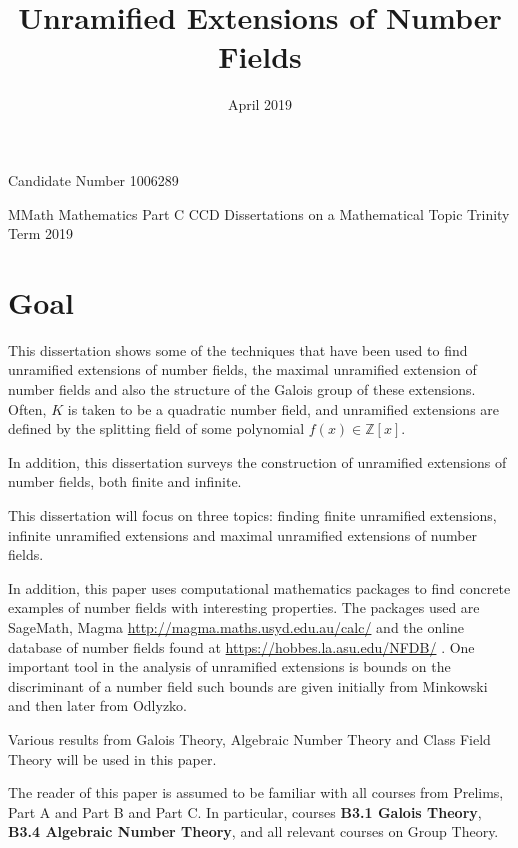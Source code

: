 \documentclass[12pt]{extarticle}
\title{Unramified Extensions of Number Fields}
\date{April 2019}
\newcommand{\Z}{\mathbb{Z}}
\newcommand{\<}{\langle}
\renewcommand{\>}{\rangle}
\theoremstyle{definition}
\begin{document}
\maketitle
\begin{center}
{\large
Candidate Number 1006289

\bigbreak
MMath Mathematics Part C
\bigbreak
CCD Dissertations on a Mathematical Topic 
\bigbreak
Trinity Term 2019 
}
\end{center}

\pagebreak
\tableofcontents
\section{Goal}
This dissertation shows some of the techniques that have been used to find unramified extensions of number fields, the maximal unramified extension of number fields and also the structure of the Galois group of these extensions. Often, $K$ is taken to be a quadratic number field, and unramified extensions are defined by the splitting field of some polynomial $f(x) \in \Z[x]$. \par
In addition, this dissertation surveys the construction of unramified extensions of number fields, both finite and infinite. \par
This dissertation will focus on three topics: finding finite unramified extensions, infinite unramified extensions and maximal unramified extensions of number fields. \par
In addition, this paper uses computational mathematics packages to find concrete examples of number fields with interesting properties. The packages used are SageMath, Magma \href{http://magma.maths.usyd.edu.au/calc/}{http://magma.maths.usyd.edu.au/calc/} and the online database of number fields found at \href{https://hobbes.la.asu.edu/NFDB/}{https://hobbes.la.asu.edu/NFDB/} \cite{JONE2}.
 One important tool in the analysis of unramified extensions is bounds on the discriminant of a number field such bounds are given initially from Minkowski and then later from Odlyzko. \par
 Various results from Galois Theory, Algebraic Number Theory and Class Field Theory will be used in this paper.\par
 The reader of this paper is assumed to be familiar with all courses from Prelims, Part A and Part B and Part C. In particular, courses \textbf{B3.1 Galois Theory}, \textbf{B3.4 Algebraic Number Theory}, and all relevant courses on Group Theory. 
\end{document}
